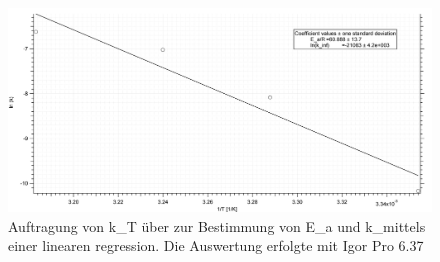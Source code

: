 \begin{figure}[h]
	\centering	
	\begin{minipage}{1\textwidth}
	\includegraphics[width=\columnwidth]{Bilder/Graph2.png}
	\end{minipage}
	
	
	\caption{Auftragung von k_T über  zur Bestimmung von E_a und k_\infty mittels einer linearen regression. Die Auswertung erfolgte mit Igor Pro 6.37}
	
	
	\label{ln}
\end{figure}





